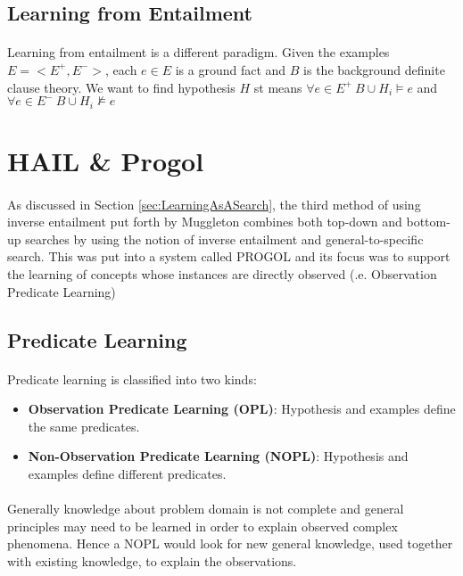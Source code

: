\documentclass{article}
\theoremstyle{plain}
\theoremstyle{definition}
\begin{document}
\begin{multicols}{2}
\subsection{Learning from Entailment}

\paragraph{} Learning from entailment is a different paradigm. Given the examples $E = <E^+, E^->$, each $e \in E$ is a ground fact and $B$ is the background definite clause theory. We want to find hypothesis $H$ st means $\forall e \in E^+\ B \cup H_i \models e$ and $\forall e \in E^-\ B \cup H_i \not\models e$

\section{HAIL \& Progol}

\paragraph{} As discussed in Section \ref{sec:LearningAsASearch}, the third method of using inverse entailment put forth by Muggleton combines both top-down and bottom-up searches by using the notion of inverse entailment and general-to-specific search. This was put into a system called PROGOL and its focus was to support the learning of concepts whose instances are directly observed (.e. Observation Predicate Learning)

\subsection{Predicate Learning}

\paragraph{} Predicate learning is classified into two kinds:

\begin{itemize}
\item \textbf{Observation Predicate Learning (OPL)}: Hypothesis and examples define the same predicates. 
\item \textbf{Non-Observation Predicate Learning (NOPL)}: Hypothesis and examples define different predicates.
\end{itemize}

\paragraph{} Generally knowledge about problem domain is not complete and general principles may need to be learned in order to explain observed complex phenomena. Hence a NOPL would look for new general knowledge, used together with existing knowledge, to explain the observations. 


\end{multicols}
\end{document}
